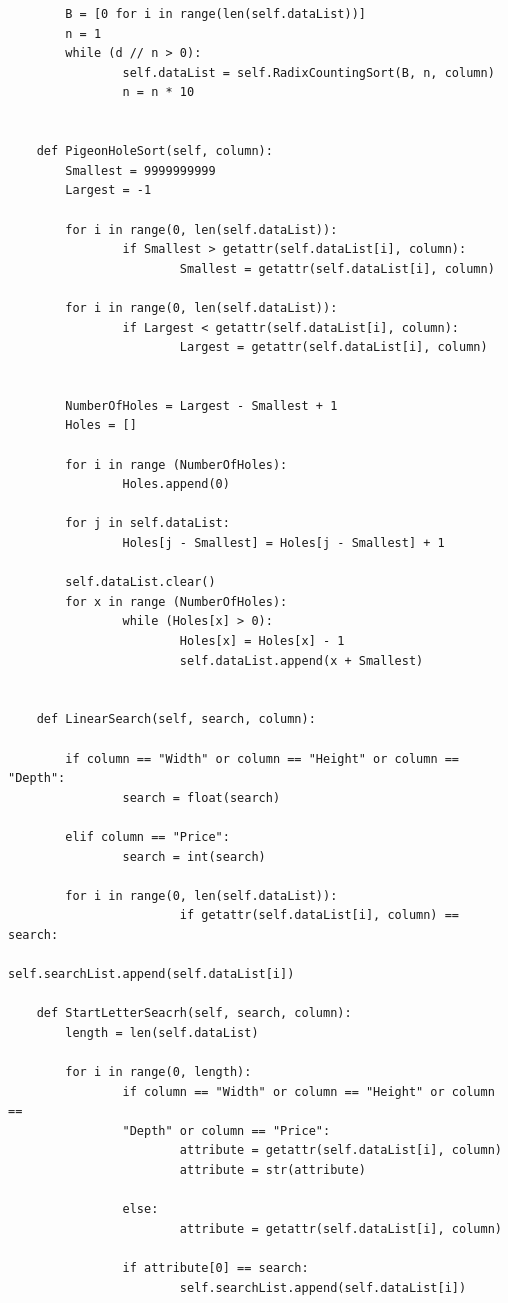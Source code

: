 \documentclass[12pt]{article}
\begin{document}
\begin{verbatim}
        B = [0 for i in range(len(self.dataList))]
        n = 1
        while (d // n > 0):
                self.dataList = self.RadixCountingSort(B, n, column)
                n = n * 10


    def PigeonHoleSort(self, column):
        Smallest = 9999999999
        Largest = -1

        for i in range(0, len(self.dataList)):
                if Smallest > getattr(self.dataList[i], column):
                        Smallest = getattr(self.dataList[i], column)

        for i in range(0, len(self.dataList)):
                if Largest < getattr(self.dataList[i], column):
                        Largest = getattr(self.dataList[i], column)

        
        NumberOfHoles = Largest - Smallest + 1
        Holes = []

        for i in range (NumberOfHoles):
                Holes.append(0)

        for j in self.dataList:
                Holes[j - Smallest] = Holes[j - Smallest] + 1

        self.dataList.clear()
        for x in range (NumberOfHoles):
                while (Holes[x] > 0):
                        Holes[x] = Holes[x] - 1
                        self.dataList.append(x + Smallest)


    def LinearSearch(self, search, column):

        if column == "Width" or column == "Height" or column == "Depth":
                search = float(search)

        elif column == "Price":
                search = int(search)

        for i in range(0, len(self.dataList)):
                        if getattr(self.dataList[i], column) == search:
                                self.searchList.append(self.dataList[i])

    def StartLetterSeacrh(self, search, column):
        length = len(self.dataList)

        for i in range(0, length):
                if column == "Width" or column == "Height" or column ==
                "Depth" or column == "Price":
                        attribute = getattr(self.dataList[i], column)
                        attribute = str(attribute)

                else:
                        attribute = getattr(self.dataList[i], column)

                if attribute[0] == search:
                        self.searchList.append(self.dataList[i])


\end{verbatim}
\end{document}
